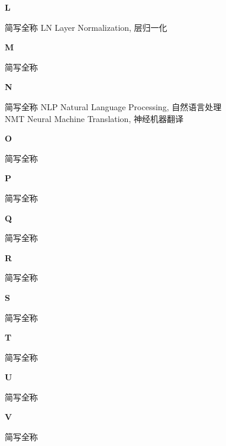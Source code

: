 \noindent\textbf{\LARGE L}
\begin{tabbing}
    简写\qquad\qquad\qquad\= 全称 \kill
    LN \> Layer Normalization, 层归一化
\end{tabbing}

\noindent\textbf{\LARGE M}
\begin{tabbing}
    简写\qquad\qquad\qquad\= 全称 \kill
\end{tabbing}

\noindent\textbf{\LARGE N}
\begin{tabbing}
    简写\qquad\qquad\qquad\= 全称 \kill
    NLP \> Natural Language Processing, 自然语言处理 \\
    NMT \> Neural Machine Translation, 神经机器翻译 \\
\end{tabbing}

\noindent\textbf{\LARGE O}
\begin{tabbing}
    简写\qquad\qquad\qquad\= 全称 \kill
\end{tabbing}

\noindent\textbf{\LARGE P}
\begin{tabbing}
    简写\qquad\qquad\qquad\= 全称 \kill
\end{tabbing}

\noindent\textbf{\LARGE Q}
\begin{tabbing}
    简写\qquad\qquad\qquad\= 全称 \kill
\end{tabbing}

\noindent\textbf{\LARGE R}
\begin{tabbing}
    简写\qquad\qquad\qquad\= 全称 \kill
\end{tabbing}

\noindent\textbf{\LARGE S}
\begin{tabbing}
    简写\qquad\qquad\qquad\= 全称 \kill
\end{tabbing}

\noindent\textbf{\LARGE T}
\begin{tabbing}
    简写\qquad\qquad\qquad\= 全称 \kill
\end{tabbing}

\noindent\textbf{\LARGE U}
\begin{tabbing}
    简写\qquad\qquad\qquad\= 全称 \kill
\end{tabbing}

\noindent\textbf{\LARGE V}
\begin{tabbing}
    简写\qquad\qquad\qquad\= 全称 \kill
\end{tabbing}


